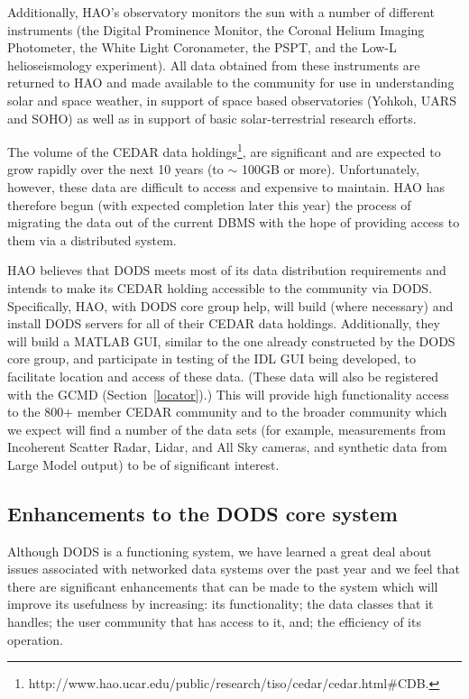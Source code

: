 \documentclass[12pt]{article}
\begin{document}
Additionally, \ac{HAO}'s observatory monitors the sun with a number 
of different instruments (the Digital Prominence Monitor, the Coronal 
Helium Imaging Photometer, the White Light Coronameter, the PSPT, and 
the Low-L helioseismology experiment). All data obtained from these
instruments are returned 
to \ac{HAO} and made available to the community for use in 
understanding solar and space weather, in support of space based 
observatories (Yohkoh, UARS and SOHO) as well as in support of basic 
solar-terrestrial research efforts.

The volume of the \ac{CEDAR} data holdings\footnote{
http://www.hao.ucar.edu/public/research/tiso/cedar/cedar.html\#CDB.}, are
significant and are expected to grow rapidly over the next 10 years 
(to $\sim$ 100GB or more). Unfortunately, however, these data are 
difficult to access and expensive to maintain. \ac{HAO} has 
therefore begun (with expected completion later this year) the 
process of migrating the data out of the 
current \ac{DBMS} with the hope of providing access to them via 
a distributed system. 

\ac{HAO} believes that \ac{DODS} meets most of its data distribution 
requirements and intends to make its \ac{CEDAR} holding accessible 
to the community via \ac{DODS}. Specifically, \ac{HAO}, with \ac{DODS} 
core group help, will build (where necessary) and install \ac{DODS} 
servers for all of their \ac{CEDAR} data holdings. Additionally, they 
will build a \acl{MATLAB} \ac{GUI}, similar to the one already 
constructed by the \ac{DODS} core group, and participate in testing of 
the \ac{IDL} \ac{GUI} being developed, to facilitate location and 
access of these data. (These data will also be registered with the 
\ac{GCMD} (Section~\ref{locator}).) This will provide high 
functionality access to the 800$+$ member \ac{CEDAR}
community and to the broader community which we expect will find a 
number of the data sets (for example, measurements from Incoherent 
Scatter Radar, Lidar, and All Sky cameras, and synthetic data from 
Large Model output) to be of significant interest. 

\subsection{Enhancements to the \ac{DODS} core system}
\label{enhancements}

Although \ac{DODS} is a functioning system, we have learned a great 
deal about issues associated with networked data systems over the past
year and we feel that there are significant enhancements that can
be made to the system which will improve its usefulness by increasing: 
its functionality; the data classes that it handles; the user community 
that has access to it, and; the efficiency of its operation. 
\end{document}
